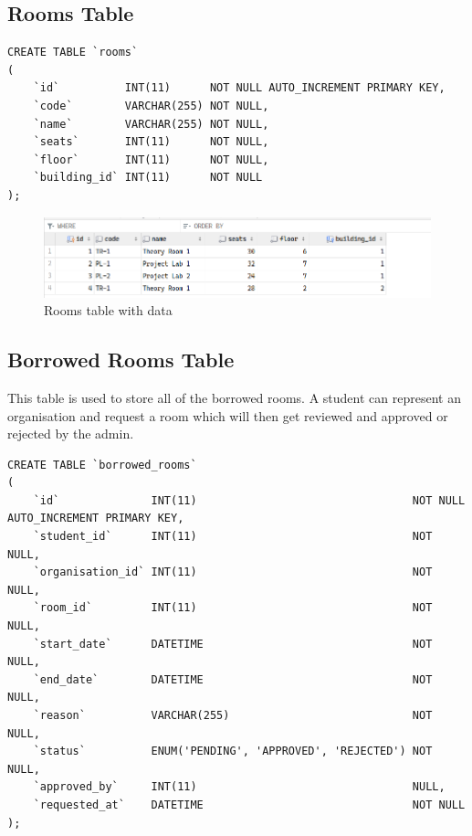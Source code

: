 \documentclass[12pt,titlepage]{article}
\begin{document}
\pagebreak

\subsection{Rooms Table}
\begin{verbatim}
CREATE TABLE `rooms`
(
    `id`          INT(11)      NOT NULL AUTO_INCREMENT PRIMARY KEY,
    `code`        VARCHAR(255) NOT NULL,
    `name`        VARCHAR(255) NOT NULL,
    `seats`       INT(11)      NOT NULL,
    `floor`       INT(11)      NOT NULL,
    `building_id` INT(11)      NOT NULL
);
\end{verbatim}

\begin{figure}[h]
    \centering
    \includegraphics[width=\textwidth]{./images/rooms-table.png}
    \caption{Rooms table with data}
\end{figure}

\subsection{Borrowed Rooms Table}
This table is used to store all of the borrowed rooms. 
A student can represent an organisation and request a room which will then get reviewed and approved or rejected by the admin.

\begin{verbatim}
CREATE TABLE `borrowed_rooms`
(
    `id`              INT(11)                                 NOT NULL AUTO_INCREMENT PRIMARY KEY,
    `student_id`      INT(11)                                 NOT NULL,
    `organisation_id` INT(11)                                 NOT NULL,
    `room_id`         INT(11)                                 NOT NULL,
    `start_date`      DATETIME                                NOT NULL,
    `end_date`        DATETIME                                NOT NULL,
    `reason`          VARCHAR(255)                            NOT NULL,
    `status`          ENUM('PENDING', 'APPROVED', 'REJECTED') NOT NULL,
    `approved_by`     INT(11)                                 NULL,
    `requested_at`    DATETIME                                NOT NULL
);
\end{verbatim}
\end{document}

